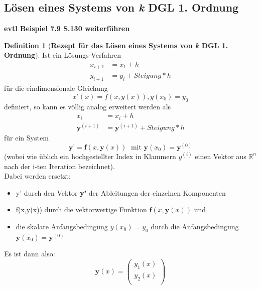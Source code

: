 \documentclass{article}
\theoremstyle{satz}
\theoremstyle{definition}
\newtheorem{definition}{Definition}
\begin{document}
\subsection{Lösen eines Systems von \textit{k} DGL 1. Ordnung}
\textbf{evtl Beispiel 7.9 S.130 weiterführen}\\

\begin{tcolorbox}
\begin{definition}[\textbf{Rezept für das Lösen eines Systems von \textit{k} DGL 1. Ordnung}]
Ist ein Lösungs-Verfahren
\begin{equation}
\begin{split}
	x_{i+1} &= x_1 + h\\
	y_{i+1} &= y_i + Steigung * h
\end{split}
\end{equation}
für die eindimensionale Gleichung
\begin{equation}
x'(x) = f(x,y(x)), y(x_0) = y_0
\end{equation}
definiert, so kann es völlig analog erweitert werden als
\begin{equation}
\begin{split}
x_i &= x_i + h\\
\textbf{y}^{(i+1)} &= \textbf{y}^{(i+1)} + Steigung * h
\end{split}
\end{equation}
für ein System
\begin{equation}
\textbf{y'} = \textbf{f}(x,\textbf{y}(x)) \; \textrm{ mit } \textbf{y}(x_0) = \textbf{y}^{(0)}
\end{equation}
(wobei wie üblich ein hochgestellter Index in Klammern $y^{(i)}$ einen Vektor aus $\mathbb{R}^n$ nach der i-ten Iteration bezeichnet).\\
Dabei werden ersetzt:
\begin{itemize}
	\item y' durch den Vektor \textbf{y'} der Ableitungen der einzelnen Komponenten
	\item f(x,y(x)) durch die vektorwertige Funktion $\textbf{f}(x,\textbf{y}(x))$ und
	\item die skalare Anfangsbedingung $y(x_0) = y_0$ durch die Anfangsbedingung $\textbf{y}(x_0) = \textbf{y}^{(0)}$
\end{itemize}
Es ist dann also:
\begin{equation}
\textbf{y}(x) = \begin{pmatrix}
y_1(x)\\
y_2(x)\\

\end{pmatrix}
\end{equation}
\end{definition}
\end{tcolorbox}
\end{document}
